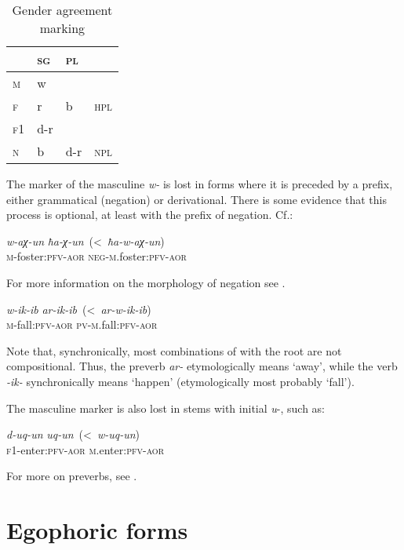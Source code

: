 \documentclass[output=paper]{langsci/langscibook}
\begin{document}
\begin{table}
  \caption{Gender agreement marking}

\begin{tabular}{@{}llll@{}}
\toprule
& \textsc{sg} & \textsc{pl} &\tabularnewline \midrule
\textsc{m} & w & & \tabularnewline
\textsc{f} & r & b & \textsc{hpl}\tabularnewline
\textsc{f1} & d-r & &\tabularnewline \midrule
\textsc{n} & b & d-r & \textsc{npl}\tabularnewline
\bottomrule
\end{tabular}
\end{table}

The marker of the masculine \emph{w-} is lost in forms where it is
preceded by a prefix, either grammatical (negation) or derivational. There is some evidence 
that this process is optional, at least with the prefix of negation.
Cf.:


\ea %
\gll \emph{w-aχ-un}  \emph{ħa-χ-un}~(\textless{}~\emph{ħa-w-aχ-un})\\
\textsc{m}-foster:\textsc{pfv}-\textsc{aor} {} \textsc{neg}-\textsc{m}.foster:\textsc{pfv}-\textsc{aor}\\
\z

For more information on the morphology of negation see .

\ea %
\gll  \emph{w-ik-ib}  \emph{ar-ik-ib}~(\textless{}~\emph{ar-w-ik-ib})\\
\textsc{m}-fall:\textsc{pfv}-\textsc{aor} {} \textsc{pv}-\textsc{m}.fall:\textsc{pfv}-\textsc{aor}\\
\z

Note that, synchronically, most combinations of  with the root
are not compositional. Thus, the preverb \emph{ar-} etymologically means
`away', while the verb \emph{-ik-} synchronically means `happen'
(etymologically most probably `fall').

The masculine marker is also lost in stems with initial \emph{u}-, such
as:

\ea %
\gll \emph{d-uq-un}  \emph{uq-un}~(\textless{}~\emph{w-uq-un})\\
\textsc{f1}-enter:\textsc{pfv}-\textsc{aor} {} \textsc{m}.enter:\textsc{pfv}-\textsc{aor}\\
\z

For more on preverbs, see .


\section{Egophoric forms}\label{egophoric-forms}
\end{document}
